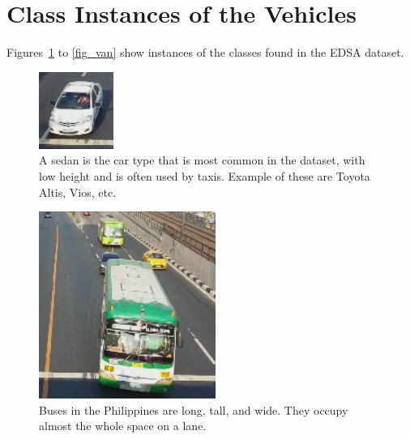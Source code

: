 \documentclass[conference]{IEEEtran}
\begin{document}
\clearpage

\appendices
\section{Class Instances of the Vehicles}

Figures~\ref{fig_sedan} to \ref{fig_van} show instances of the classes found in the EDSA dataset.

\begin{figure}[!h]
\centering
\includegraphics{vehicle_sedan.png}
\caption{A sedan is the car type that is most common in the dataset, with low height and is often used by taxis. Example of these are Toyota Altis, Vios, etc.}
\label{fig_sedan}
\end{figure}

\begin{figure}[!h]
\centering
\includegraphics{vehicle_bus.png}
\caption{Buses in the Philippines are long, tall, and wide. They occupy almost the whole space  on a lane.}
\label{fig_bus}
\end{figure}
\end{document}
